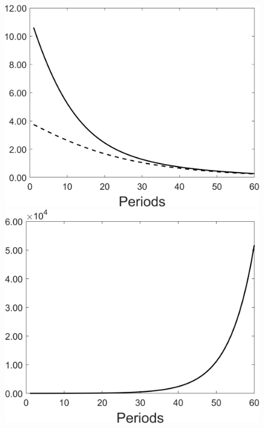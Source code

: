 \begin{figure}[h!!]
\begin{minipage}[]{0.32\textwidth}
\end{minipage}
\begin{minipage}[]{0.32\textwidth}
	\includegraphics[width=1\textwidth]{../codding_model/Own/figures/Rep_agent/staticRam_LF_separate_xc_periods59_eppsilon4.00_zeta1.40_Ad08_Ac04_thetac0.70_thetad0.56_HetGrowth1_tauul0.181_util0_withtarget0_lgd0.png}
\end{minipage}
\begin{minipage}[]{0.32\textwidth}
	\includegraphics[width=1\textwidth]{../codding_model/Own/figures/Rep_agent/staticRam_LF_separate_ydyc_periods59_eppsilon4.00_zeta1.40_Ad08_Ac04_thetac0.70_thetad0.56_HetGrowth1_tauul0.181_util0_withtarget0_lgd0.png}
\end{minipage}
\end{figure}

